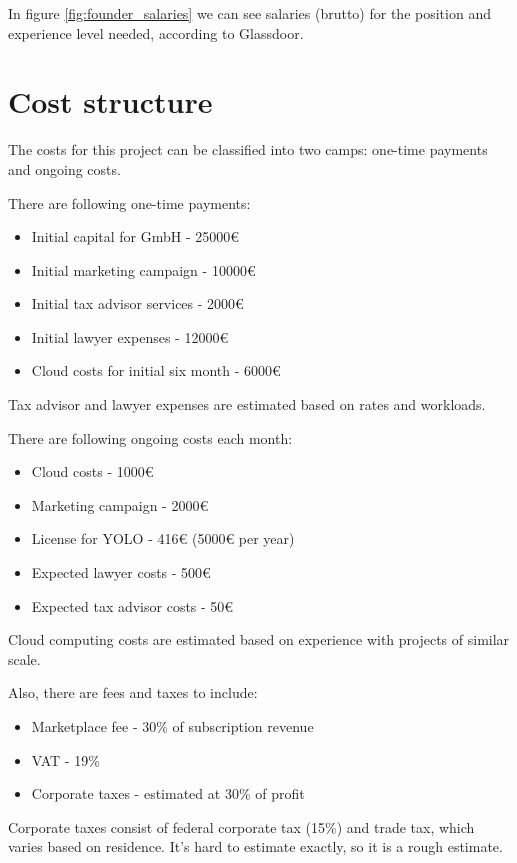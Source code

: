 In figure \ref{fig:founder_salaries} we can see salaries (brutto) for the position and experience level needed, according to Glassdoor.

\section{Cost structure}

The costs for this project can be classified into two camps: one-time payments and ongoing costs. 

There are following one-time payments:

\begin{itemize}
    \item Initial capital for GmbH - 25000€
    \item Initial marketing campaign - 10000€
    \item Initial tax advisor services - 2000€
    \item Initial lawyer expenses - 12000€
    \item Cloud costs for initial six month - 6000€  
\end{itemize} 

Tax advisor and lawyer expenses are estimated based on rates and workloads.

There are following ongoing costs each month:

\begin{itemize}
    \item Cloud costs - 1000€
    \item Marketing campaign - 2000€
    \item License for YOLO - 416€ (5000€ per year)
    \item Expected lawyer costs - 500€
    \item Expected tax advisor costs - 50€
\end{itemize}

Cloud computing costs are estimated based on experience with projects of similar scale.

Also, there are fees and taxes to include:

\begin{itemize}
    \item Marketplace fee - 30\% of subscription revenue 
    \item VAT - 19\%
    \item Corporate taxes - estimated at 30\% of profit
\end{itemize}

Corporate taxes consist of federal corporate tax (15\%) and trade tax, which varies based on residence. It's hard to estimate exactly, so it is a rough estimate.

